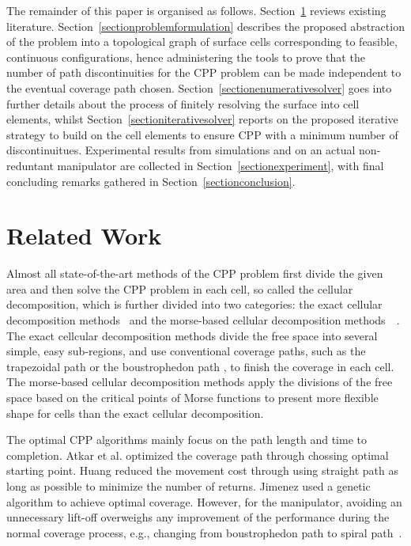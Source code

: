 \documentclass[journal]{IEEEtran}
\begin{document}
The remainder of this paper is organised as follows. Section~\ref{sectionrelatedwork} reviews existing literature. 
Section~\ref{sectionproblemformulation} describes the proposed abstraction of the problem into a topological graph of surface cells corresponding 
to feasible, continuous configurations, hence administering the tools to prove that the number of path discontinuities for the CPP problem can be made independent to the eventual coverage path chosen. %
Section~\ref{sectionenumerativesolver} goes into further details about the process of finitely resolving the surface into cell elements, whilst 
Section~\ref{sectioniterativesolver} reports on the proposed iterative strategy to build on the cell elements to ensure CPP with a minimum number of discontinuitues. Experimental results from simulations and on an actual non-reduntant manipulator are collected in Section~\ref{sectionexperiment}, with final concluding remarks gathered in Section~\ref{sectionconclusion}. 


\section{Related Work}\label{sectionrelatedwork}
Almost all state-of-the-art methods of the CPP problem first divide the given area and then solve the CPP problem in each cell, so called the cellular decomposition, which is further divided into two categories: the exact cellular decomposition methods~\cite{lumelsky1990dynamic} and the morse-based cellular decomposition methods~\cite{choset2000exact}~\cite{Acar2002Morse}. 
The exact cellcular decomposition methods divide the free space into several simple, easy sub-regions, and use conventional coverage paths, such as the trapezoidal path \cite{choset2005principles} or the boustrophedon path \cite{choset1998coverage}\cite{choset2000coverage}, to finish the coverage in each cell. 
The morse-based cellular decomposition methods apply the divisions of the free space based on the critical points of Morse functions to present more flexible shape for cells than the exact cellular decomposition. 

The optimal CPP algorithms mainly focus on the path length and time to completion.
Atkar et al. \cite{Atkar2003Towards} optimized the coverage path through chossing optimal starting point. 
Huang \cite{huang2001optimal} reduced the movement cost through using straight path as long as possible to minimize the number of returns. 
Jimenez \cite{jimenez2007optimal} used a genetic algorithm to achieve optimal coverage. 
However, for the manipulator, avoiding an unnecessary lift-off overweighs any improvement of the performance during the normal coverage process, e.g., changing from boustrophedon path to spiral path~\cite{hassan2018a}. 
\end{document}
